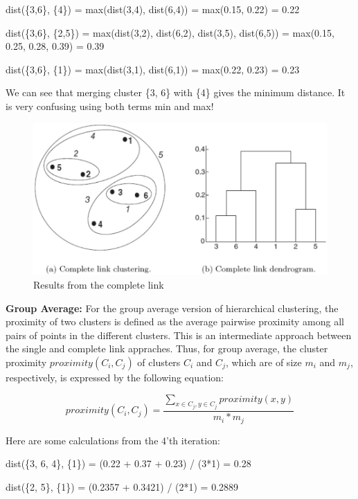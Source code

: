 		{\color{red} dist(\{3,6\}, \{4\}) = max(dist(3,4), dist(6,4)) = max(0.15, 0.22) = 0.22}

		{\color{blue} dist(\{3,6\}, \{2,5\}) = max(dist(3,2), dist(6,2), dist(3,5), dist(6,5)) = 
		max(0.15, 0.25, 0.28, 0.39)	= 0.39}

		{\color{orange} dist(\{3,6\}, \{1\}) = max(dist(3,1), dist(6,1)) = max(0.22, 0.23) = 0.23}

		We can see that merging cluster \{3, 6\} with \{4\} gives the minimum distance. It is
		very confusing using both terms min and max!

			\begin{figure}[H]
				\centering
				\includegraphics[scale=0.3]{pics/completelink.png}
				\caption{Results from the complete link}
			\end{figure}

		\clearpage
		{\bf Group Average:} For the group average version of hierarchical clustering, the
		proximity of two clusters is defined as the average pairwise proximity among all pairs of
		points in the different clusters. This is an intermediate approach between the single
		and complete link appraches. Thus, for group average, the cluster proximity 
		$proximity(C_{i}, C_{j})$ of clusters $C_{i}$ and $C_{j}$, which are of size $m_{i}$
		and $m_{j}$, respectively, is expressed by the following equation:

		\begin{equation}
			proximity(C_{i}, C_{j}) = \frac{\sum_{x \in C_{j}, y \in C_{j}} proximity(x,y)}{m_{i}*m_{j}}
		\end{equation}

		Here are some calculations from the 4'th iteration:

		{\color{red} dist(\{3, 6, 4\}, \{1\}) = (0.22 + 0.37 + 0.23) / (3*1) = 0.28}

		{\color{blue} dist(\{2, 5\}, \{1\}) = (0.2357 + 0.3421) / (2*1) = 0.2889}

